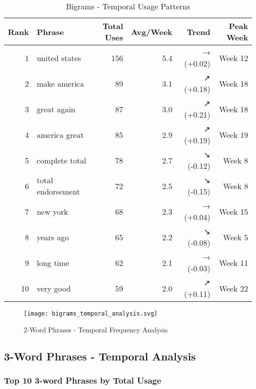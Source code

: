 \documentclass[12pt,a4paper]{article}
\begin{document}
\begin{table}[H]
\centering
\caption{Bigrams - Temporal Usage Patterns}
\begin{tabular}{@{}rlrrrr@{}}
\toprule
\textbf{Rank} & \textbf{Phrase} & \textbf{Total Uses} & \textbf{Avg/Week} & \textbf{Trend} & \textbf{Peak Week} \\
\midrule
1 & united states & 156 & 5.4 & → (+0.02) & Week 12 \\
2 & make america & 89 & 3.1 & ↗ (+0.18) & Week 18 \\
3 & great again & 87 & 3.0 & ↗ (+0.21) & Week 18 \\
4 & america great & 85 & 2.9 & ↗ (+0.19) & Week 19 \\
5 & complete total & 78 & 2.7 & ↘ (-0.12) & Week 8 \\
6 & total endorsement & 72 & 2.5 & ↘ (-0.15) & Week 8 \\
7 & new york & 68 & 2.3 & → (+0.04) & Week 15 \\
8 & years ago & 65 & 2.2 & ↘ (-0.08) & Week 5 \\
9 & long time & 62 & 2.1 & → (-0.03) & Week 11 \\
10 & very good & 59 & 2.0 & ↗ (+0.11) & Week 22 \\
\bottomrule
\end{tabular}
\end{table}

\begin{figure}[H]
\centering
\texttt{[image: bigrams\_temporal\_analysis.svg]}
\caption{2-Word Phrases - Temporal Frequency Analysis}
\label{fig:bigrams_temporal}
\end{figure}

\subsection{3-Word Phrases - Temporal Analysis}

\subsubsection{Top 10 3-word Phrases by Total Usage}
\end{document}
